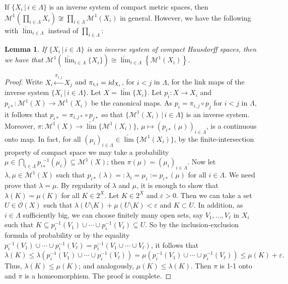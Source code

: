 \documentclass[12pt,final,3p,times]{elsarticle}
\newtheorem{lem}[thm]{Lemma}
\theoremstyle{definition}
\numberwithin{equation}{section}
\begin{document}
If $\{X_i\,|\,i\in\Lambda\}$ is an inverse system of compact metric spaces, then $\mathcal{M}^1(\prod_{i\in\Lambda}X_i)\not\cong\prod_{i\in\Lambda}\mathcal{M}^1(X_i)$ in general. 
However, we have the following with $\underleftarrow{\lim}_{i\in\Lambda}$ instead of $\prod_{i\in\Lambda}$:

\begin{lem}\label{4.4}
If $\{X_i\,|\,i\in\Lambda\}$ is an inverse system of compact Hausdorff spaces, then we have that $\mathcal{M}^1\left(\underleftarrow{\lim}_{i\in\Lambda}\{X_i\}\right)\cong\underleftarrow{\lim}_{i\in\Lambda}\left\{\mathcal{M}^1(X_i)\right\}$.
\end{lem}

\begin{proof}
Write $X_i\xleftarrow{\pi_{i,j}}X_j$ and $\pi_{i,i}=\textsl{id}_{X_i}$, for $i<j$ in $\Lambda$, for the link maps of the inverse system $\{X_i\,|\,i\in\Lambda\}$. Let $X=\underleftarrow{\lim}\{X_i\}$. Let $p_i\colon X\rightarrow X_i$ and $p_{i*}\colon\mathcal{M}^1(X)\rightarrow\mathcal{M}^1(X_i)$ be the canonical maps. As $p_i=\pi_{i,j}\circ p_j$ for $i<j$ in $\Lambda$, it follows that $p_{i*}=\pi_{i,j*}\circ p_{j*}$ so that $\{\mathcal{M}^1(X_i)\,|\,i\in\Lambda\}$ is an inverse system.
Moreover,
$\pi\colon\mathcal{M}^1(X)\rightarrow\underleftarrow{\lim}\{\mathcal{M}^1(X_i)\}$, $\mu\mapsto(p_{i*}(\mu))_{i\in\Lambda}$,
is a continuous onto map. In fact, for all $(\mu_i)_{i\in\Lambda}\in\underleftarrow{\lim}\{\mathcal{M}^1(X_i)\}$, by the finite-intersection property of compact space we may take a probability $\mu\in\bigcap_{i\in\Lambda}{p_i}_*^{-1}(\mu_i)\subseteq\mathcal{M}^1(X)$; then $\pi(\mu)=(\mu_i)_{i\in\Lambda}$.
Now let $\lambda, \mu\in\mathcal{M}^1(X)$ such that $p_{i*}(\lambda)=:\lambda_i=\mu_i:=p_{i*}(\mu)$ for all $i\in\Lambda$. We need prove that $\lambda=\mu$. By regularity of $\lambda$ and $\mu$, it is enough to show that $\lambda(K)=\mu(K)$ for all $K\in2^X$. Let $K\in2^X$ and $\varepsilon>0$. Then we can take a set $U\in\mathscr{O}(X)$ such that $\lambda(U\setminus K)+\mu(U\setminus K)<\varepsilon$ and $K\subset U$. In addition, as $i\in\Lambda$ sufficiently big, we can choose finitely many open sets, say $V_1,\dotsc,V_\ell$ in $X_i$ such that $K\subseteq p_i^{-1}(V_1)\cup\dotsm\cup p_i^{-1}(V_\ell)\subseteq U$. So by the inclusion-exclusion formula of probability or by the equality $p_i^{-1}(V_1)\cup\dotsm\cup p_i^{-1}(V_\ell)=p_i^{-1}(V_1\cup\dotsm\cup V_\ell)$, it follows that
\begin{equation*}
\lambda(K)\le\lambda(p_i^{-1}(V_1)\cup\dotsm\cup p_i^{-1}(V_\ell))
=\mu(p_i^{-1}(V_1)\cup\dotsm\cup p_i^{-1}(V_\ell))\le\mu(K)+\varepsilon.
\end{equation*}
Thus, $\lambda(K)\le\mu(K)$; and analogously, $\mu(K)\le\lambda(K)$. Then $\pi$ is 1-1 onto and $\pi$ is a homeomorphism. The proof is complete.
\end{proof}
\end{document}

